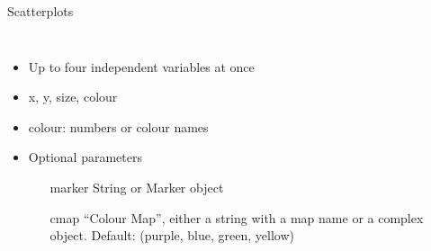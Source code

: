 
\begin{frame}[fragile]{Scatterplots}
%
\vspace{-15pt}
\begin{columns}[t]
\begin{itemize}
\item Up to four independent variables at once
\item x, y, size, colour
\item colour: numbers or colour names
\item Optional parameters

	\begin{minipage}{.10\linewidth}
		\phantom{x}
	\end{minipage}
	\begin{minipage}{.85\linewidth}
		\begin{itemize}
		\item[marker] String or Marker object
		\item[cmap] \enquote{Colour Map}, either a string with a map name or a complex object. Default:  (purple, blue, green, yellow)
		\end{itemize}
	\end{minipage}


\end{itemize}
\end{columns}
\end{frame}
